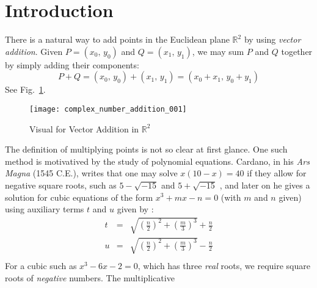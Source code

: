 \documentclass{article}
\theoremstyle{definition}
\begin{document}
    \section{Introduction}
        There is a natural way to add points in the Euclidean plane
        $\mathbb{R}^{2}$ by using \textit{vector addition}. Given
        $P=(x_{0},\,y_{0})$ and $Q=(x_{1},\,y_{1})$, we may sum $P$ and $Q$
        together by simply adding their components:
        \begin{equation}
            P+Q
            =(x_{0},\,y_{0})+(x_{1},\,y_{1})
            =(x_{0}+x_{1},\,y_{0}+y_{1})
        \end{equation}
        See Fig.~\ref{fig:complex_number_addition_001}.
        \begin{figure}
            \centering
            \texttt{[image: complex\_number\_addition\_001]}
            \caption{Visual for Vector Addition in $\mathbb{R}^{2}$}
            \label{fig:complex_number_addition_001}
        \end{figure}
        The definition of multiplying points is not so clear at first glance.
        One such method is motivatived by the study of polynomial equations.
        Cardano, in his \textit{Ars Magna} (1545 C.E.), writes that
        one may solve $x(10-x)=40$ if they allow for negative square roots,
        such as $5-\sqrt{-15}$ and $5+\sqrt{-15}$
        \cite[p.~252]{KlineMathematicalHistory}, and later on he gives a
        solution for cubic equations of the form
        $x^{3}+mx-n=0$ (with $m$ and $n$ given) using auxiliary terms $t$
        and $u$ given by \cite[p.~264]{KlineMathematicalHistory}:
        \begin{equation}
            \begin{array}{rcl}
                \displaystyle
                t
                &=&
                \displaystyle
                \sqrt{\left(\frac{n}{2}\right)^{2}+\left(\frac{m}{3}\right)^{3}}
                +\frac{n}{2}\\[1.5em]
                \displaystyle
                u
                &=&
                \displaystyle
                \sqrt{\left(\frac{n}{2}\right)^{2}+\left(\frac{m}{3}\right)^{3}}
                -\frac{n}{2}\\
            \end{array}
        \end{equation}
        For a cubic such as $x^{3}-6x-2=0$, which has three \textit{real} roots,
        we require square roots of \textit{negative} numbers. The multiplicative
\end{document}
